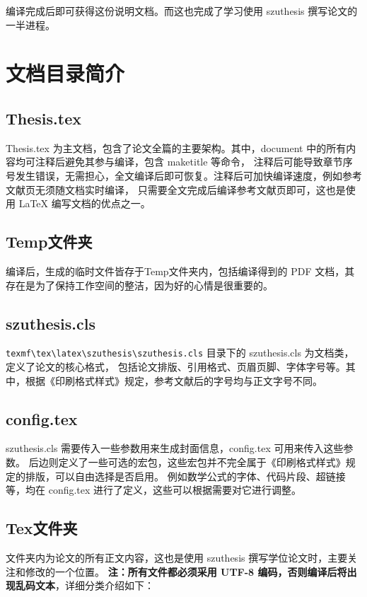 编译完成后即可获得这份说明文档。而这也完成了学习使用 szuthesis 撰写论文的一半进程。


\section{文档目录简介}

\subsection{Thesis.tex}

Thesis.tex 为主文档，包含了论文全篇的主要架构。其中，document 中的所有内容均可注释后避免其参与编译，包含 maketitle 等命令，
注释后可能导致章节序号发生错误，无需担心，全文编译后即可恢复。注释后可加快编译速度，例如参考文献页无须随文档实时编译，
只需要全文完成后编译参考文献页即可，这也是使用 \LaTeX{} 编写文档的优点之一。

\subsection{Temp文件夹}

编译后，生成的临时文件皆存于Temp文件夹内，包括编译得到的 PDF 文档，其存在是为了保持工作空间的整洁，因为好的心情是很重要的。

\subsection{szuthesis.cls}

\verb!texmf\tex\latex\szuthesis\szuthesis.cls! 目录下的 szuthesis.cls 为文档类，定义了论文的核心格式，
包括论文排版、引用格式、页眉页脚、字体字号等。其中，根据《印刷格式样式》规定，参考文献后的字号均与正文字号不同。

\subsection{config.tex}

szuthesis.cls 需要传入一些参数用来生成封面信息，config.tex 可用来传入这些参数。
后边则定义了一些可选的宏包，这些宏包并不完全属于《印刷格式样式》规定的排版，可以自由选择是否启用。
例如数学公式的字体、代码片段、超链接等，均在 config.tex 进行了定义，这些可以根据需要对它进行调整。

\subsection{Tex文件夹}

文件夹内为论文的所有正文内容，这也是使用 szuthesis 撰写学位论文时，主要关注和修改的一个位置。
\textbf{注：所有文件都必须采用 UTF-8 编码，否则编译后将出现乱码文本}，详细分类介绍如下：

